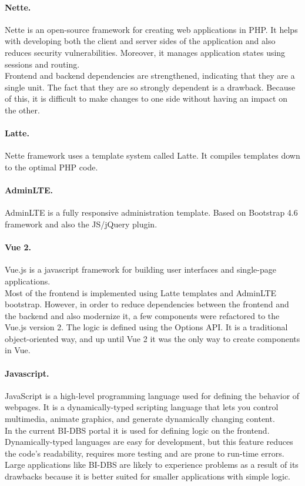 \paragraph*{Nette.} Nette is an open-source framework for creating web applications in PHP. It helps with developing both the client and server sides of the application and also reduces security vulnerabilities. Moreover, it manages application states using sessions and routing.\cite{nette-doc}\\ 
Frontend and backend dependencies are strengthened, indicating that they are a single unit. The fact that they are so strongly dependent is a drawback. Because of this, it is difficult to make changes to one side without having an impact on the other. 

\paragraph*{Latte.} Nette framework uses a template system called Latte. It compiles templates down to the optimal PHP code.\cite{latte-doc}

\paragraph*{AdminLTE.} AdminLTE is a fully responsive administration template. Based on Bootstrap 4.6 framework and also the JS/jQuery plugin.\cite{adminlte-doc} 

\paragraph*{Vue 2.} Vue.js is a javascript framework for building user interfaces and single-page applications.\\
Most of the frontend is implemented using Latte templates and AdminLTE bootstrap. However, in order to reduce dependencies between the frontend and the backend and also modernize it, a few components were refactored to the Vue.js version 2. The logic is defined using the Options API. It is a traditional object-oriented way, and up until Vue 2 it was the only way to create components in Vue.\cite{vue2-doc, apivue-dzakelsek}

\paragraph*{Javascript.} JavaScript is a high-level programming language used for defining the behavior of webpages. It is a dynamically-typed scripting language that lets you control multimedia, animate graphics, and generate dynamically changing content.\cite{js-doc}\\ 
In the current BI-DBS portal it is used for defining logic on the frontend. Dynamically-typed languages are easy for development, but this feature reduces the code's readability, requires more testing and are prone to run-time errors. Large applications like BI-DBS are likely to experience problems as a result of its drawbacks because it is better suited for smaller applications with simple logic.

